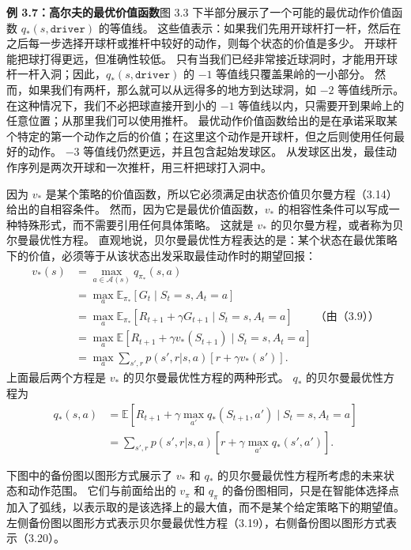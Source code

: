 \documentclass[UTF8,12pt,a4paper,fontset=fandol]{ctexart}
\begin{document}
\noindent\textbf{例 3.7：高尔夫的最优价值函数}\quad 图 3.3 下半部分展示了一个可能的最优动作价值函数 $q_*(s,\texttt{driver})$ 的等值线。
这些值表示：如果我们先用开球杆打一杆，然后在之后每一步选择开球杆或推杆中较好的动作，则每个状态的价值是多少。
开球杆能把球打得更远，但准确性较低。
只有当我们已经非常接近球洞时，才能用开球杆一杆入洞；因此，$q_*(s,\texttt{driver})$ 的 $-1$ 等值线只覆盖果岭的一小部分。
然而，如果我们有两杆，那么就可以从远得多的地方到达球洞，如 $-2$ 等值线所示。
在这种情况下，我们不必把球直接开到小的 $-1$ 等值线以内，只需要开到果岭上的任意位置；从那里我们可以使用推杆。
最优动作价值函数给出的是在承诺采取某个特定的第一个动作之后的价值；在这里这个动作是开球杆，但之后则使用任何最好的动作。
$-3$ 等值线仍然更远，并且包含起始发球区。
从发球区出发，最佳动作序列是两次开球和一次推杆，用三杆把球打入洞中。

因为 $v_*$ 是某个策略的价值函数，所以它必须满足由状态价值贝尔曼方程（3.14）给出的自相容条件。
然而，因为它是最优价值函数，$v_*$ 的相容性条件可以写成一种特殊形式，而不需要引用任何具体策略。
这就是 $v_*$ 的贝尔曼方程，或者称为贝尔曼最优性方程。
直观地说，贝尔曼最优性方程表达的是：某个状态在最优策略下的价值，必须等于从该状态出发采取最佳动作时的期望回报：
\begin{equation}
\begin{aligned}
v_*(s)
&= \max_{a\in\mathcal{A}(s)}q_{\pi_*}(s,a)\\
&= \max_a \mathbb{E}_{\pi_*}[G_t\mid S_t=s,A_t=a]\\
&= \max_a \mathbb{E}_{\pi_*}[R_{t+1}+\gamma G_{t+1}\mid S_t=s,A_t=a]\qquad \text{（由（3.9））}\\
&= \max_a \mathbb{E}[R_{t+1}+\gamma v_*(S_{t+1})\mid S_t=s,A_t=a]\\
&= \max_a \sum_{s',r}p(s',r|s,a)\left[r+\gamma v_*(s')\right].
\end{aligned}
\tag{3.19}
\end{equation}
上面最后两个方程是 $v_*$ 的贝尔曼最优性方程的两种形式。
$q_*$ 的贝尔曼最优性方程为
\begin{equation}
\begin{aligned}
q_*(s,a)
&= \mathbb{E}\left[R_{t+1}+\gamma\max_{a'}q_*(S_{t+1},a')\mid S_t=s,A_t=a\right]\\
&= \sum_{s',r}p(s',r|s,a)\left[r+\gamma\max_{a'}q_*(s',a')\right].
\end{aligned}
\tag{3.20}
\end{equation}

下图中的备份图以图形方式展示了 $v_*$ 和 $q_*$ 的贝尔曼最优性方程所考虑的未来状态和动作范围。
它们与前面给出的 $v_\pi$ 和 $q_\pi$ 的备份图相同，只是在智能体选择点加入了弧线，以表示取的是该选择上的最大值，而不是某个给定策略下的期望值。
左侧备份图以图形方式表示贝尔曼最优性方程（3.19），右侧备份图以图形方式表示（3.20）。
\end{document}
